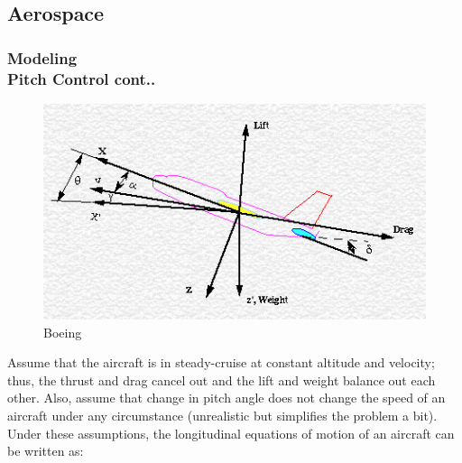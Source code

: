 \documentclass[hyperref={pdfpagelabels=true}]{beamer}
\newcounter{angle}
\begin{document}
\subsection{Aerospace}



\begin{frame}
\frametitle{Modeling\\ {\large Pitch Control {\tiny cont..}}}
\begin{figure}[!tbp]
\includegraphics[scale = 0.35]{figs/Selection_041.png}
 \caption{Boeing}
\end{figure}
\small{
Assume that the aircraft is in steady-cruise at constant altitude and velocity; thus, the thrust and drag cancel out and the lift and weight balance out each other. Also, assume that change in pitch angle does not change the speed of an aircraft under any circumstance (unrealistic but simplifies the problem a bit). Under these assumptions, the longitudinal equations of motion of an aircraft can be written as:}
\end{frame}
\end{document}
